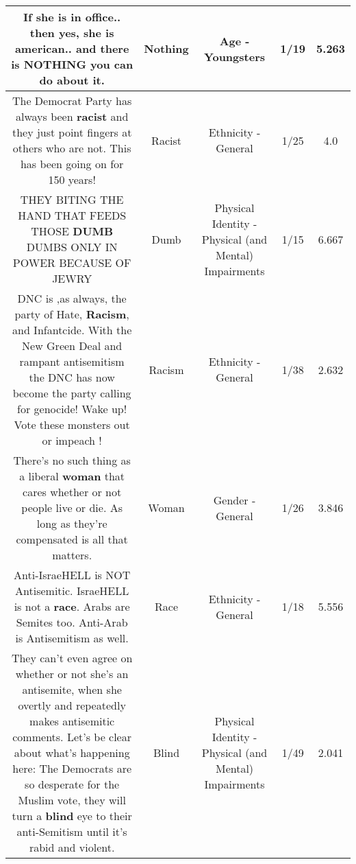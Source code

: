 \documentclass[11pt]{article}
\newlength\mylength
\begin{document}
\begin{center}
\begin{longtable}{|C{.65\mylength}|C{.30\mylength}|C{.12\mylength}|C{.12\mylength}|C{.12\mylength}|}
  \small If she is in office.. then yes, she is american.. and there is \textbf{NOTHING} you can do about it.\normalsize   & Nothing & Age - Youngsters & 1/19 & 5.263 \\  \hline
  \small The Democrat Party has always been \textbf{racist} and they just point fingers at others who are not.  This has been going on for 150 years!\normalsize   & Racist & Ethnicity - General & 1/25 & 4.0 \\  \hline
  \small THEY BITING THE HAND THAT FEEDS THOSE \textbf{DUMB} DUMBS ONLY IN POWER BECAUSE OF JEWRY\normalsize   & Dumb & Physical Identity - Physical (and Mental) Impairments & 1/15 & 6.667 \\  \hline
  \small DNC is ,as always, the party of Hate, \textbf{Racism}, and Infantcide. With the New Green Deal and rampant antisemitism the DNC has now become the party calling for genocide! Wake up! Vote these monsters out or impeach !\normalsize   & Racism & Ethnicity - General & 1/38 & 2.632 \\  \hline
  \small There's no such thing as a liberal \textbf{woman} that cares whether or not people live or die.  As long as they're compensated is all that matters.\normalsize   & Woman & Gender - General & 1/26 & 3.846 \\  \hline
  \small Anti-IsraeHELL is NOT Antisemitic. IsraeHELL is not a \textbf{race}. Arabs are Semites too. Anti-Arab is Antisemitism as well.\normalsize   & Race & Ethnicity - General & 1/18 & 5.556 \\  \hline
  \small They can't even agree on whether or not she's an antisemite, when she overtly and repeatedly makes antisemitic comments. Let's be clear about what's happening here: The Democrats are so desperate for the Muslim vote, they will turn a \textbf{blind} eye to their anti-Semitism until it's rabid and violent.\normalsize   & Blind & Physical Identity - Physical (and Mental) Impairments & 1/49 & 2.041 \\  \hline

\end{longtable}
\end{center}
\end{document}
